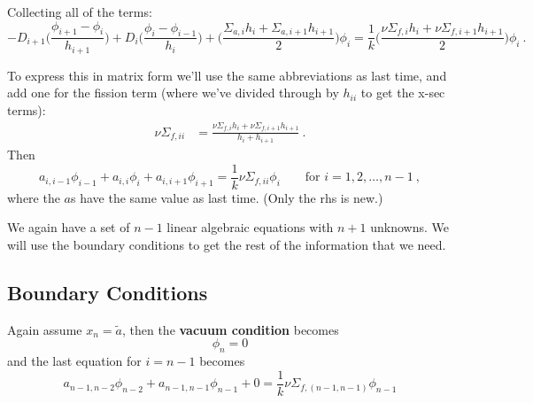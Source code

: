 \documentclass[12pt]{article}
\begin{document}
Collecting all of the terms:
%
\begin{equation}
-D_{i+1}\biggl(\frac{\phi_{i+1} - \phi_i}{h_{i+1}}\biggr) + D_{i}\biggl(\frac{\phi_{i} - \phi_{i-1}}{h_{i}}\biggr) + \biggl(\frac{\Sigma_{a,i}h_i + \Sigma_{a,i+1}h_{i+1}}{2} \biggr)\phi_i =   \frac{1}{k} \biggl(\frac{\nu\Sigma_{f,i}h_i + \nu\Sigma_{f,i+1}h_{i+1}}{2} \biggr)\phi_i \:.\nonumber
\end{equation}

To express this in matrix form we'll use the same abbreviations as last time, and add one for the fission term (where we've divided through by $h_{ii}$ to get the x-sec terms):
\begin{align}
\nu\Sigma_{f,ii} &= \frac{\nu\Sigma_{f,i}h_i + \nu\Sigma_{f,i+1}h_{i+1}}{h_i + h_{i+1}} \:.\nonumber
\end{align}
%
Then
%
\[a_{i,i-1} \phi_{i-1} + a_{i,i}\phi_i + a_{i, i+1} \phi_{i+1} = \frac{1}{k}\nu\Sigma_{f,ii} \phi_i \qquad \text{for } i = 1, 2, \dots, n-1\:,\]
%
where the $a$s have the same value as last time. (Only the rhs is new.)
%

We again have a set of $n-1$ linear algebraic equations with $n+1$ unknowns. We will use the boundary conditions to get the rest of the information that we need.


\subsection*{Boundary Conditions}

Again assume $x_n = \tilde{a}$, then the \textbf{vacuum condition} becomes
\[\phi_n = 0\]
and the last equation for $i=n-1$ becomes
\[a_{n-1,n-2} \phi_{n-2} + a_{n-1,n-1}\phi_{n-1} + 0 = \frac{1}{k}\nu\Sigma_{f,(n-1,n-1)} \phi_{n-1}\]
\end{document}
